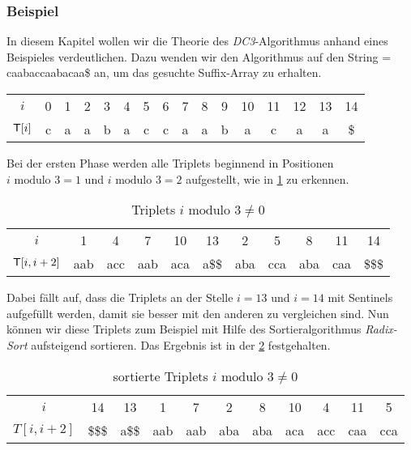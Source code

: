 \subsubsection{Beispiel}
\label{dc3:algorithmus:beispiel}


In diesem Kapitel wollen wir die Theorie des \emph{DC3}-Al\-go\-rith\-mus anhand eines Beispieles verdeutlichen. Dazu wenden wir den Al\-go\-rith\-mus auf den String  = caabaccaabacaa\$ an, um das gesuchte Suffix-Array zu erhalten.

\begin{table}[H]
	\centering
	\begin{tabular}{c| c c c c c c c c c c c c c c c}
		$i$ & 0 & 1 & 2 & 3 & 4 & 5 & 6 & 7 & 8 & 9 & 10 & 11 & 12 & 13 & 14 \\
		$\inputtext[i]$ & c & a & a & b & a & c & c & a & a & b & a & c & a & a & \$
	\end{tabular}
\end{table}

Bei der ersten Phase werden alle Triplets beginnend in Positionen\\$i \text{ modulo } 3 = 1$ und $i \text{ modulo } 3 = 2$ aufgestellt, wie in \cref{tab:unsortierteTriplets} zu erkennen.

\begin{table}[H]
	\centering
	\begin{tabular}{c| c c c c c ||  c c c c c }
		$i$ & 1 & 4 & 7 & 10 & 13 & 2 & 5 & 8 & 11 & 14\\
		$\inputtext[i, i+2]$ & aab & acc & aab & aca & a\$\$ & aba & cca & aba & caa & \$\$\$
	\end{tabular}
	\caption{Triplets $i \text{ modulo } 3 \neq 0$}
	\label{tab:unsortierteTriplets}
\end{table}

Dabei fällt auf, dass die Triplets an der Stelle $i = 13$ und $i = 14$ mit Sentinels aufgefüllt werden, damit sie besser mit den anderen zu vergleichen sind. Nun können wir diese Triplets zum Beispiel mit Hilfe des Sortieralgorithmus \emph{Radix-Sort} aufsteigend sortieren. Das Ergebnis ist in der \cref{tab:sortierteTriplets} festgehalten.

\begin{table}[H]
	\centering
	\begin{tabular}{c| c c c c c c c c c c}
		$i$ & 14 & 13 & 1 & 7 & 2 & 8 & 10 & 4 & 11 & 5\\
		$T[i, i+2]$ & \$\$\$ & a\$\$ & aab & aab & aba & aba & aca & acc & caa & cca 
	\end{tabular}
	\caption{sortierte Triplets $i \text{ modulo } 3 \neq 0$}
	\label{tab:sortierteTriplets}
\end{table}

